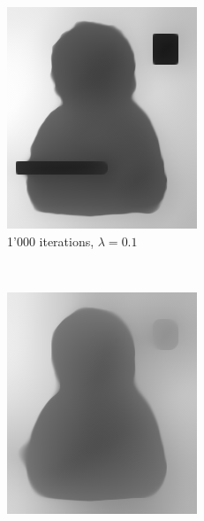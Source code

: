 \documentclass{paper}
\begin{document}
\begin{figure}[h]
\centering
\begin{subfigure}[h]{0.3\textwidth}
	\centering
	\includegraphics[width=\textwidth]{hat-iter1000-lambda0_1-alpha0_001}
	\caption*{1'000 iterations, $\lambda = 0.1$}
\end{subfigure}
~
\begin{subfigure}[h]{0.3\textwidth}
	\centering
	\includegraphics[width=\textwidth]{hat-iter5000-lambda0_1-alpha0_001}

\end{subfigure}
\end{figure}
\end{document}
